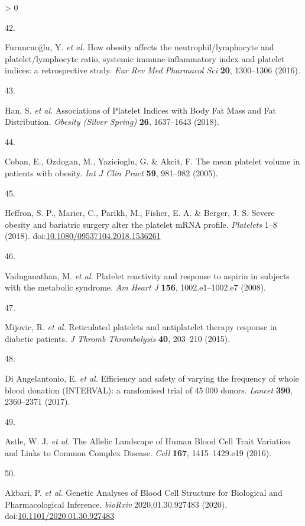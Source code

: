 \documentclass[11pt,twoside]{bristolthesis}
\newlength{\cslhangindent}
\newlength{\csllabelwidth}
\newenvironment{CSLReferences}[2] %
 {%
  \setlength{\parindent}{0pt}
  \ifodd #1 \everypar{\setlength{\hangindent}{\cslhangindent}}\ignorespaces\fi
  \ifnum #2 > 0
  \setlength{\parskip}{#2\baselineskip}
  \fi
 }%
 {}
\newcommand{\CSLLeftMargin}[1]{\parbox[t]{\csllabelwidth}{#1}}
\newcommand{\CSLRightInline}[1]{\parbox[t]{\linewidth - \csllabelwidth}{#1}\break}
\begin{document}
\begin{CSLReferences}{0}{0}
\leavevmode\hypertarget{ref-Furuncuoglu2016}{}%
\CSLLeftMargin{42. }
\CSLRightInline{Furuncuoğlu, Y. \emph{et al.} {How obesity affects the neutrophil/lymphocyte and platelet/lymphocyte ratio, systemic immune-inflammatory index and platelet indices: a retrospective study}. \emph{Eur Rev Med Pharmacol Sci} \textbf{20}, 1300--1306 (2016).}

\leavevmode\hypertarget{ref-Han2018a}{}%
\CSLLeftMargin{43. }
\CSLRightInline{Han, S. \emph{et al.} {Associations of Platelet Indices with Body Fat Mass and Fat Distribution}. \emph{Obesity (Silver Spring)} \textbf{26}, 1637--1643 (2018).}

\leavevmode\hypertarget{ref-Coban2005}{}%
\CSLLeftMargin{44. }
\CSLRightInline{Coban, E., Ozdogan, M., Yazicioglu, G. \& Akcit, F. {The mean platelet volume in patients with obesity}. \emph{Int J Clin Pract} \textbf{59}, 981--982 (2005).}

\leavevmode\hypertarget{ref-Heffron2018}{}%
\CSLLeftMargin{45. }
\CSLRightInline{Heffron, S. P., Marier, C., Parikh, M., Fisher, E. A. \& Berger, J. S. {Severe obesity and bariatric surgery alter the platelet mRNA profile}. \emph{Platelets} 1--8 (2018). doi:\href{https://doi.org/10.1080/09537104.2018.1536261}{10.1080/09537104.2018.1536261}}

\leavevmode\hypertarget{ref-Vaduganathan2008a}{}%
\CSLLeftMargin{46. }
\CSLRightInline{Vaduganathan, M. \emph{et al.} {Platelet reactivity and response to aspirin in subjects with the metabolic syndrome}. \emph{Am Heart J} \textbf{156}, 1002.e1--1002.e7 (2008).}

\leavevmode\hypertarget{ref-Mijovic2015a}{}%
\CSLLeftMargin{47. }
\CSLRightInline{Mijovic, R. \emph{et al.} {Reticulated platelets and antiplatelet therapy response in diabetic patients}. \emph{J Thromb Thrombolysis} \textbf{40}, 203--210 (2015).}

\leavevmode\hypertarget{ref-DiAngelantonio2017}{}%
\CSLLeftMargin{48. }
\CSLRightInline{Di Angelantonio, E. \emph{et al.} {Efficiency and safety of varying the frequency of whole blood donation (INTERVAL): a randomised trial of 45 000 donors}. \emph{Lancet} \textbf{390}, 2360--2371 (2017).}

\leavevmode\hypertarget{ref-Astle2016}{}%
\CSLLeftMargin{49. }
\CSLRightInline{Astle, W. J. \emph{et al.} {The Allelic Landscape of Human Blood Cell Trait Variation and Links to Common Complex Disease}. \emph{Cell} \textbf{167}, 1415--1429.e19 (2016).}

\leavevmode\hypertarget{ref-Akbari2020}{}%
\CSLLeftMargin{50. }
\CSLRightInline{Akbari, P. \emph{et al.} {Genetic Analyses of Blood Cell Structure for Biological and Pharmacological Inference}. \emph{bioRxiv} 2020.01.30.927483 (2020). doi:\href{https://doi.org/10.1101/2020.01.30.927483}{10.1101/2020.01.30.927483}}


\end{CSLReferences}
\end{document}
